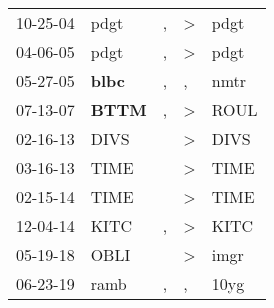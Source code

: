 \begin{supertabular}{p{0.07\textwidth}p{0.06\textwidth}p{0.02\textwidth}p{0.02\textwidth}p{0.06\textwidth}}
 10-25-04\textsuperscript{} &           pdgt\textsuperscript{} &  , &  \textgreater &  pdgt\textsuperscript{} \\
 04-06-05\textsuperscript{} &           pdgt\textsuperscript{} &  , &  \textgreater &  pdgt\textsuperscript{} \\
 05-27-05\textsuperscript{} &  \textbf{blbc\textsuperscript{}} &  , &             , &  nmtr\textsuperscript{} \\
 07-13-07\textsuperscript{} &  \textbf{BTTM\textsuperscript{}} &  , &  \textgreater &  ROUL\textsuperscript{} \\
 02-16-13\textsuperscript{} &           DIVS\textsuperscript{} &    &  \textgreater &  DIVS\textsuperscript{} \\
 03-16-13\textsuperscript{} &           TIME\textsuperscript{} &    &  \textgreater &  TIME\textsuperscript{} \\
 02-15-14\textsuperscript{} &           TIME\textsuperscript{} &    &  \textgreater &  TIME\textsuperscript{} \\
 12-04-14\textsuperscript{} &           KITC\textsuperscript{} &  , &  \textgreater &  KITC\textsuperscript{} \\
 05-19-18\textsuperscript{} &           OBLI\textsuperscript{} &    &  \textgreater &  imgr\textsuperscript{} \\
 06-23-19\textsuperscript{} &           ramb\textsuperscript{} &  , &             , &  10yg\textsuperscript{} \\
\end{supertabular}
